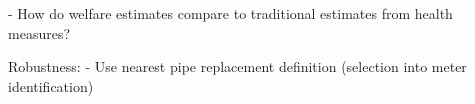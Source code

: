 \documentclass[12pt,table]{article}
\begin{document}
	- How do welfare estimates compare to traditional estimates from health measures?

Robustness:
	- Use nearest pipe replacement definition (selection into meter identification)

















\end{document}
